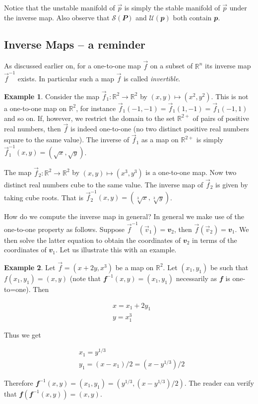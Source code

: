 \documentclass[
  a4paper,
  oneside,
  final]{krantz}
\newcommand{\R}{\mathbb{R}}
\renewcommand{\v}[1]{{\mathbfit{#1}}}
\newcommand{\stab}[1]{\mathcal{S}(#1)}
\newcommand{\unstab}[1]{\mathcal{U}(#1)}
\theoremstyle{definition}
\theoremstyle{definition}
\newtheorem{example}{Example}[chapter]
\theoremstyle{definition}
\theoremstyle{definition}
\theoremstyle{remark}
\begin{document}
Notice that the unstable manifold of \(\vec{p}\) is simply the stable manifold of \(\vec{p}\) under the inverse map. Also observe that \(\stab{\v{P}}\) and \(\unstab{\v{p}}\) both contain \(\v{p}\).

\hypertarget{recapinversemaps}{%
\subsection{Inverse Maps -- a reminder}\label{recapinversemaps}}

As discussed earlier on, for a one-to-one map \(\vec{f}\) on a subset of \(\R^{n}\) its inverse map \(\vec{f}^{-1}\) exists. In particular such a map \(\vec{f}\) is called \emph{invertible}.

\begin{example}

Consider the map \(\vec{f}_{1}: \R^2 \to \R^2\) by \((x,y) \mapsto (x^2, y^2)\). This is not a one-to-one map on \(\R^2\), for instance \(\vec{f}_1(-1, -1) = \vec{f}_1(1, -1) = \vec{f}_1(-1,1)\) and so on. If, however, we restrict the domain to the set \(\R^{2+}\) of pairs of positive real numbers, then \(\vec{f}\) is indeed one-to-one (no two distinct positive real numbers square to the same value). The inverse of \(\vec{f}_{1}\) as a map on \(\R^{2+}\) is simply \(\vec{f}_1^{-1}(x,y) = (\sqrt{x}, \sqrt{y})\).

The map \(\vec{f}_{2}: \R^2 \to \R^2\) by \((x,y) \mapsto (x^3, y^3)\) is a one-to-one map. Now two distinct real numbers cube to the same value. The inverse map of \(\vec{f}_{2}\) is given by taking cube roots. That is \(\vec{f}_2^{-1}(x,y) = (\sqrt[3]{x}, \sqrt[3]{y})\).
\end{example}

How do we compute the inverse map in general? In general we make use of the one-to-one property as follows. Suppose \(\vec{f}^{-1}(\vec{v}_1) = \v{v}_2\), then \(\vec{f}(\vec{v}_2) = \v{v}_1\). We then solve the latter equation to obtain the coordinates of \(\v{v}_2\) in terms of the coordinates of \(\v{v}_{1}\). Let us illustrate this with an example.

\begin{example}

Let \(\vec{f}= (x+2y, x^3)\) be a map on \(\R^2\). Let \((x_1, y_1)\) be such that \(f(x_1, y_1) = (x, y)\) (note that \(\v{f}^{-1}(x,y) = (x_1, y_1)\) necessarily as \(\v{f}\) is one-to=one). Then

\begin{align*}
 &x = x_1 + 2y_1\\
 &y = x_1^3
\end{align*}

Thus we get

\begin{align*}
 &x_1 = y^{1/3}\\
 &y_1 = (x - x_1)/2 = (x -y^{1/3})/2
\end{align*}

Therefore \(\v{f}^{-1}(x,y) = (x_1,y_1) = (y^{1/3}, (x- y^{1/3})/2)\). The reader can verify that \(\v{f}(\v{f}^{-1}(x,y)) = (x,y)\).
\end{example}
\end{document}
